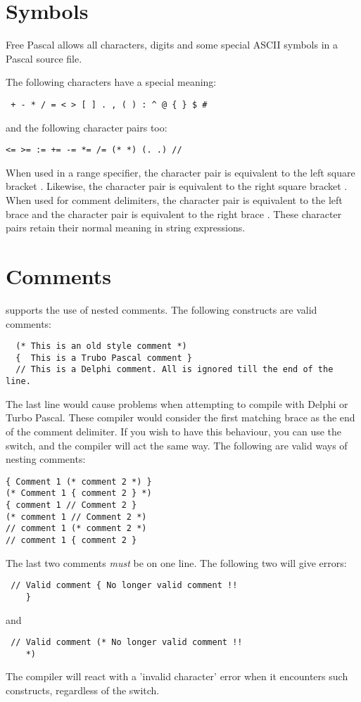 \documentclass{report}
\begin{document}
\section{Symbols}
Free Pascal allows all characters, digits and some special ASCII symbols
in a Pascal source file.

The following characters have a special meaning:
\begin{verbatim}
 + - * / = < > [ ] . , ( ) : ^ @ { } $ #
\end{verbatim}
and the following character pairs too:
\begin{verbatim}
<= >= := += -= *= /= (* *) (. .) //
\end{verbatim}
When used in a range specifier, the character pair  is equivalent to
the left square bracket \var{[}. Likewise, the character pair  is
equivalent to the right square bracket \var{]}.
When used for comment delimiters, the character pair \var{(*} is equivalent
to the  left brace \var{\{} and the character pair \var{*)} is equivalent
to the right brace \var{\}}.
These character pairs retain their normal meaning in string expressions.
\section{Comments}
\fpc supports the use of nested comments. The following constructs are valid
comments:
\begin{verbatim}
  (* This is an old style comment *)
  {  This is a Trubo Pascal comment }
  // This is a Delphi comment. All is ignored till the end of the line.
\end{verbatim}
The last line would cause problems when attempting to compile with Delphi or
Turbo Pascal. These compiler would consider the first matching brace
\var{\}} as the end of the comment delimiter. If you wish to have this
behaviour, you can use the  switch, and the \fpc compiler will
act the same way.
The following are valid ways of nesting comments:
\begin{verbatim}
{ Comment 1 (* comment 2 *) }
(* Comment 1 { comment 2 } *)
{ comment 1 // Comment 2 }
(* comment 1 // Comment 2 *)
// comment 1 (* comment 2 *)
// comment 1 { comment 2 }
\end{verbatim}
The last two comments {\em must} be on one line. The following two will give
errors:
\begin{verbatim}
 // Valid comment { No longer valid comment !!
    }
\end{verbatim}
and
\begin{verbatim}
 // Valid comment (* No longer valid comment !!
    *)
\end{verbatim}
The compiler will react with a 'invalid character' error when it encounters
such constructs, regardless of the  switch.
\end{document}
